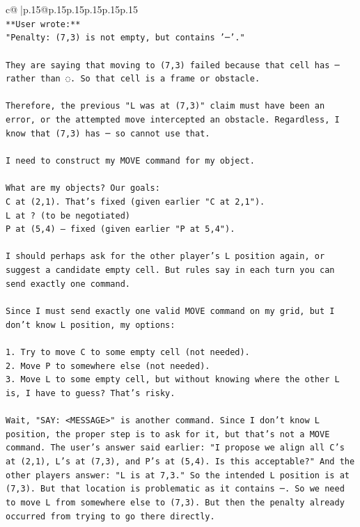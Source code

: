 \documentclass{article}
\begin{document}
{\begin{supertabular}{c@{$\;$}|p{.15\linewidth}@{}p{.15\linewidth}p{.15\linewidth}p{.15\linewidth}p{.15\linewidth}p{.15\linewidth}}
{{{\\ 
\texttt{**User wrote:**  } \\
\texttt{"Penalty: (7,3) is not empty, but contains '─'."} \\
\\ 
\texttt{They are saying that moving to (7,3) failed because that cell has ─ rather than ◌. So that cell is a frame or obstacle.} \\
\\ 
\texttt{Therefore, the previous "L was at (7,3)" claim must have been an error, or the attempted move intercepted an obstacle. Regardless, I know that (7,3) has ─ so cannot use that.} \\
\\ 
\texttt{I need to construct my MOVE command for my object.} \\
\\ 
\texttt{What are my objects? Our goals:  } \\
\texttt{C at (2,1). That's fixed (given earlier "C at 2,1").  } \\
\texttt{L at ? (to be negotiated)  } \\
\texttt{P at (5,4) — fixed (given earlier "P at 5,4").} \\
\\ 
\texttt{I should perhaps ask for the other player's L position again, or suggest a candidate empty cell. But rules say in each turn you can send exactly one command.  } \\
\\ 
\texttt{Since I must send exactly one valid MOVE command on my grid, but I don't know L position, my options:} \\
\\ 
\texttt{1. Try to move C to some empty cell (not needed).  } \\
\texttt{2. Move P to somewhere else (not needed).  } \\
\texttt{3. Move L to some empty cell, but without knowing where the other L is, I have to guess? That's risky.} \\
\\ 
\texttt{Wait, "SAY: <MESSAGE>" is another command. Since I don't know L position, the proper step is to ask for it, but that's not a MOVE command. The user's answer said earlier: "I propose we align all C's at (2,1), L's at (7,3), and P's at (5,4). Is this acceptable?" And the other players answer: "L is at 7,3." So the intended L position is at (7,3). But that location is problematic as it contains ─. So we need to move L from somewhere else to (7,3). But then the penalty already occurred from trying to go there directly.  } \\
}}}
\end{supertabular}}
\end{document}
